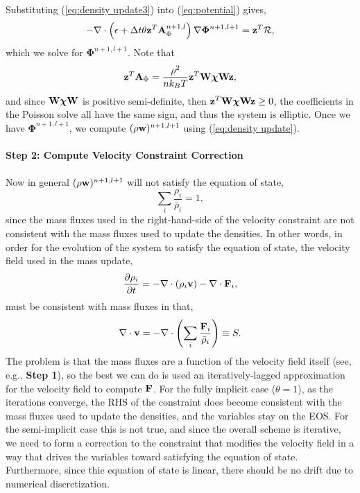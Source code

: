 \documentclass[final]{siamltex}
\def\Ab {{\bf A}}
\def\Fb {{\bf F}}
\def\vb {{\bf v}}
\def\wb {{\bf w}}
\def\Wb {{\bf W}}
\def\zb {{\bf z}}
\def\chib   {\boldsymbol{\chi}}
\def\Phib   {\boldsymbol{\Phi}}
\begin{document}
Substituting (\ref{eq:density update3}) into (\ref{eq:potential}) gives,
\begin{equation}
-\nabla\cdot\left(\epsilon + \Delta t\theta\zb^T\Ab_\Phi^{n+1,l}\right)\nabla\Phib^{n+1,l+1} = \zb^T\mathcal{R},
\end{equation}
which we solve for $\Phib^{n+1,l+1}$.  Note that
\begin{equation}
\zb^T \Ab_\Phi = \frac{\rho^2}{nk_BT}\zb^T\Wb\chib\Wb\zb,
\end{equation}
and since $\Wb\chib\Wb$ is positive semi-definite, then $\zb^T\Wb\chib\Wb\zb \ge 0$,
the coefficients in the Poisson solve all have the same sign, and thus the system
is elliptic.  Once we have $\Phib^{n+1,l+1}$, we compute $(\rho\wb)^{n+1,l+1}$ using
(\ref{eq:density update}).\\ \\
{\bf Step 2: Compute Velocity Constraint Correction}\\ \\
Now in general $(\rho\wb)^{n+1,l+1}$ will not satisfy the equation of state,
\begin{equation}
\sum_i \frac{\rho_i}{\bar\rho_i} = 1,
\end{equation}
since the mass fluxes used in the right-hand-side of the velocity constraint are not
consistent with the mass fluxes used to update the densities.
In other words, in order for the evolution of the system to satisfy the equation of state,
the velocity field used in the mass update,
\begin{equation}
\frac{\partial\rho_i}{\partial t} = -\nabla\cdot(\rho_i\vb) - \nabla\cdot\Fb_i,
\end{equation}
must be consistent with mass fluxes in that,
\begin{equation}
\nabla\cdot\vb = -\nabla\cdot\left(\sum_i\frac{\Fb_i}{\bar\rho_i}\right) \equiv S.
\end{equation}
The problem is that the mass fluxes are a function of the velocity field itself
(see, e.g., {\bf Step 1}), so the best we can do is used an iteratively-lagged
approximation for the velocity field to compute $\Fb$.  
For the fully implicit case ($\theta=1$), as the iterations converge, the RHS
of the constraint does become consistent with the mass fluxes used to update
the densities, and the variables stay on the EOS.
For the semi-implicit case this is not true, and since the overall scheme
is iterative, we need to form a correction to the constraint that modifies the
velocity field in a way that drives the variables toward satisfying the equation of 
state.  Furthermore, since thie equation of state is linear, there should be no
drift due to numerical discretization.
\end{document}
